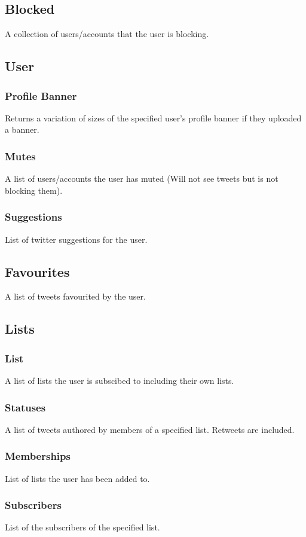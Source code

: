 \documentclass{article}
\begin{document}
	\subsection{Blocked}
		A collection of users/accounts that the user is blocking.

	\subsection{User}
		\subsubsection{Profile Banner}
			Returns a variation of sizes of the specified user's profile banner if they uploaded a banner.

		\subsubsection{Mutes}
			A list of users/accounts the user has muted (Will not see tweets but is not blocking them).

		\subsubsection{Suggestions}
			List of twitter suggestions for the user.

	\subsection{Favourites}
		A list of tweets favourited by the user.

	\subsection{Lists}
		\subsubsection{List}
			A list of lists the user is subscibed to including their own lists.

		\subsubsection{Statuses}
			A list of tweets authored by members of a specified list. Retweets are included.

		\subsubsection{Memberships}
			List of lists the user has been added to.

		\subsubsection{Subscribers}
			List of the subscribers of the specified list.
\end{document}

